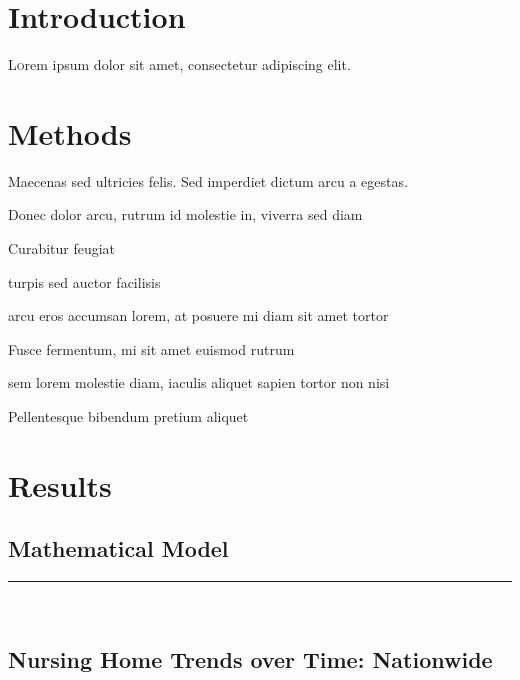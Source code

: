 \documentclass[twoside]{article}
\begin{document}
\begin{multicols}{2} %

\section{Introduction}

\lettrine[nindent=0em,lines=3]{L} orem ipsum dolor sit amet, consectetur adipiscing elit.
\lipsum[2-3] %


\section{Methods}

Maecenas sed ultricies felis. Sed imperdiet dictum arcu a egestas. 
\begin{compactitem}
\item Donec dolor arcu, rutrum id molestie in, viverra sed diam
\item Curabitur feugiat
\item turpis sed auctor facilisis
\item arcu eros accumsan lorem, at posuere mi diam sit amet tortor
\item Fusce fermentum, mi sit amet euismod rutrum
\item sem lorem molestie diam, iaculis aliquet sapien tortor non nisi
\item Pellentesque bibendum pretium aliquet
\end{compactitem}
\lipsum[4] %


\section{Results}
\subsection{Mathematical Model}
\rule{\linewidth}{0.5pt}\\

\subsection{Nursing Home Trends over Time: Nationwide}


\end{multicols}
\end{document}
